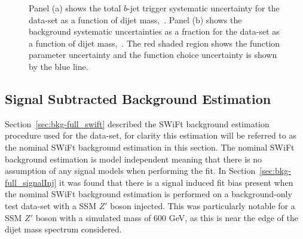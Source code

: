 \begin{figure}[!ht]
  \begin{center}
    \captionsetup[subfigure]{aboveskip=0pt,justification=centering}
  \end{center}
  \vspace{-1mm}
  \caption{Panel (a) shows the total $b$-jet trigger systematic uncertainty for the \lm{} data-set as a function of dijet mass,~\mjj.
    Panel (b) shows the background systematic uncertainties as a fraction for the \lm{} data-set as a function of dijet mass,~\mjj.
    The red shaded region shows the function parameter uncertainty and the function choice uncertainty is shown by the blue line.}
  \label{fig:lim-lowmass_syst}
\end{figure}

\subsection{Signal Subtracted Background Estimation}
\label{sec:lim-full_ssb}

Section~\ref{sec:bkg-full_swift} described the SWiFt background estimation procedure used for the \lm{} data-set,
for clarity this estimation will be referred to as the nominal SWiFt background estimation in this section.
The nominal SWiFt background estimation is model independent meaning that there is no assumption of any signal models when performing the fit.
In Section~\ref{sec:bkg-full_signalInj} it was found that there is a signal induced fit bias present when
the nominal SWiFt background estimation is performed on a background-only test data-set with a SSM $Z'$ boson injected.
This was particularly notable for a SSM $Z'$ boson with a simulated mass of 600 GeV,
as this is near the edge of the dijet mass spectrum considered.


